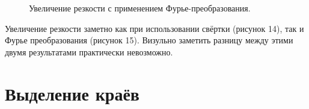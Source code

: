 \documentclass[a5paper, 10pt]{article}
\theoremstyle{definition}
\theoremstyle{plain}
\theoremstyle{remark}
\begin{document}
\begin{figure}[h!]
\caption{Увеличение резкости с применением Фурье-преобразования.}
\end{figure}

\newpage
Увеличение резкости заметно как при использовании свёртки (рисунок 14), так и Фурье преобразования (рисунок 15). Визульно заметить разницу между этими двумя результатами практически невозможно.

\newpage
\section{Выделение краёв}
\end{document}
